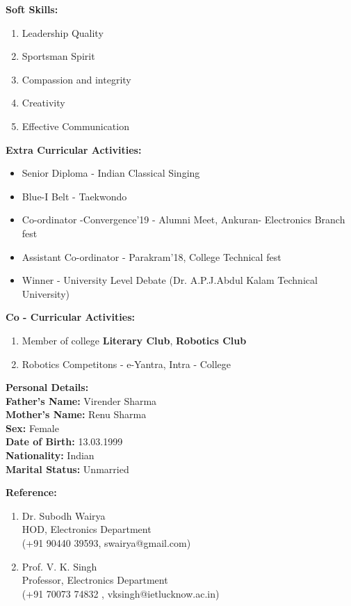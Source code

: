 \documentclass {article}
\begin{document}
\begin {flushleft} \Large \textbf{ Soft Skills:} \end{flushleft}
	\begin {enumerate}
		\item Leadership Quality
		\item Sportsman Spirit
		\item Compassion and integrity
		\item Creativity
		\item Effective Communication
	\end {enumerate}
\begin {flushleft} \Large \textbf{ Extra Curricular Activities:} \end{flushleft}
	\begin {itemize}
		\item Senior Diploma - Indian Classical Singing
		\item Blue-I Belt - Taekwondo
		\item Co-ordinator -Convergence'19 - Alumni Meet, Ankuran- Electronics Branch fest
		\item Assistant Co-ordinator - Parakram'18, College Technical fest 
		\item Winner - University Level Debate (Dr. A.P.J.Abdul Kalam Technical University)
	\end {itemize}
\begin {flushleft} \Large \textbf {Co - Curricular Activities:} \end{flushleft}
	\begin {enumerate}
		\item Member of college \textbf{Literary Club}, \textbf{Robotics Club}
		\item Robotics Competitons - e-Yantra, Intra - College		 
	\end {enumerate}
\begin {flushleft}  \Large \textbf {Personal Details: }\\ \large \textbf {Father's Name:} Virender Sharma\\ 
 \textbf {Mother's Name: }Renu Sharma \\ 
\textbf {Sex:} Female \\ 
\textbf {Date of Birth:} 13.03.1999\\ 
\textbf {Nationality:} Indian\\ 
\textbf {Marital Status:} Unmarried\\
\end {flushleft}
\newpage 
\begin {flushleft} \Large \textbf {Reference:}  \end{flushleft}
	\begin {enumerate}
		\item Dr. Subodh Wairya\\ HOD, Electronics Department\\ (+91 90440 39593, swairya@gmail.com)
		\item Prof. V. K. Singh\\ Professor, Electronics Department\\(+91 70073 74832 , vksingh@ietlucknow.ac.in)
	\end {enumerate}
\end{document}
